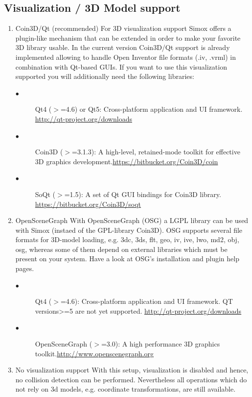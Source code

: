 \documentclass{book}
\begin{document}
\subsection{Visualization / 3D Model support}
\setcounter{MyCounter}{1}%
\begin{enumerate}[label={\arabic{MyCounter}\addtocounter{MyCounter}{1}}]
\item Coin3D/Qt (recommended) For 3D visualization support Simox offers a plugin-like mechanism that can be extended in order to make your favorite 3D library usable. In the current version Coin3D/Qt support is already implemented allowing to handle Open Inventor file formats (.iv, .vrml) in combination with Qt-based GUIs. If you want to use this visualization supported you will additionally need the following libraries:
\begin{description}
\item[$\bullet$ ] Qt4 ($>$=4.6) or Qt5: Cross-platform application and UI framework.\newline 
\hyperref[qt]{http://qt-project.org/downloads} 
\item[$\bullet$ ] Coin3D ($>$=3.1.3): A high-level, retained-mode toolkit for effective 3D graphics development.\newline  \hyperref[coin3d]{https://bitbucket.org/Coin3D/coin} 
\item[$\bullet$ ] SoQt ($>$=1.5): A set of Qt GUI bindings for Coin3D library. \newline 
\hyperref[SoQt]{https://bitbucket.org/Coin3D/soqt} 
\end{description} 
\item OpenSceneGraph With OpenSceneGraph (OSG) a LGPL library can be used with Simox (instaed of the GPL-library Coin3D). OSG supports several file formats for 3D-model loading, e.g. 3dc, 3ds, flt, geo, iv, ive, lwo, md2, obj, osg, whereas some of them depend on external libraries which must be present on your system. Have a look at OSG's installation and plugin help pages. 
\begin{description}
\item[$\bullet$ ] Qt4 ($>$=4.6): Cross-platform application and UI framework. QT versions>=5 are not yet supported.\newline 
\hyperref[qt]{http://qt-project.org/downloads} 
\item[$\bullet$ ] OpenSceneGraph ($>$=3.0): A high performance 3D graphics toolkit.\newline  \hyperref[openscene]{http://www.openscenegraph.org} 
\end{description} 
\item No visualization support With this setup, visualization is disabled and hence, no collision detection can be performed. Nevertheless all operations which do not rely on 3d models, e.g. coordinate transformations, are still available. 
\end{enumerate}
\end{document}
